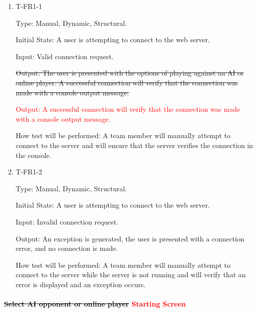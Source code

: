 \documentclass[12pt, titlepage]{article}
\begin{document}
        \begin{enumerate}
        
        \item{T-FR1-1\\}
        
            Type: Manual, Dynamic, Structural.
            					
            Initial State: A user is attempting to connect to the web server.
            					
            Input: Valid connection request.
            					
            \sout{Output: The user is presented with the options of playing against an AI or online player. A successful connection will verify that the connection was made with a console output message.}
            
            \textcolor{red}{Output: A successful connection will verify that the connection was made with a console output message.}
            					
            How test will be performed: A team member will manually attempt to connect to the server and will ensure that the server verifies the connection in the console.
        
        \item{T-FR1-2\\}
        
            Type: Manual, Dynamic, Structural.
            					
            Initial State: A user is attempting to connect to the web server.
            					
            Input: Invalid connection request.
            					
            Output: An exception is generated, the user is presented with a connection error, and no connection is made.
            					
            How test will be performed: A team member will manually attempt to connect to the server while the server is not running and will verify that an error is displayed and an exception occurs.
        
        \end{enumerate}
    
    \paragraph{\sout{Select AI opponent or online player} \textcolor{red}{Starting Screen}}
        
\end{document}
